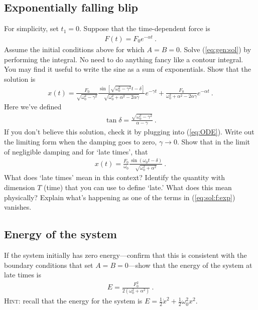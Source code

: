 \documentclass[12pt]{article}
\numberwithin{equation}{section}    %
\begin{document}
\subsection{Exponentially falling blip}

For simplicity, set $t_1 = 0$. Suppose that the time-dependent force is
\begin{align}
	F(t) = F_0 e^{-\alpha t} \ .
\end{align}
Assume the initial conditions above for which $A=B=0$. Solve (\ref{eq:gen:sol}) by performing the integral. No need to do anything fancy like a contour integral. You may find it useful to write the sine as a sum of exponentials. Show that the solution is
\begin{align}
	x(t) = \frac{F_0}{\sqrt{\omega_0^2 - \gamma^2}}
	\frac{\sin\left[ \sqrt{\omega_0^2 - \gamma^2} t - \delta \right]}{\sqrt{\omega_0^2 +\alpha^2 - 2\alpha \gamma}}
	e^{-\gamma t}
	+
	\frac{F_0}{\omega_0^2 + \alpha^2 - 2\alpha\gamma} e^{-\alpha t} \ .
	\label{eq:sol:f:exp}
\end{align}
Here we've defined
\begin{align}
	\tan \delta = \frac{\sqrt{\omega_0^2 - \gamma^2}}{\alpha - \gamma} \ .
\end{align}
If you don't believe this solution, check it by plugging into (\ref{eq:ODE}). Write out the limiting form when the damping goes to zero, $\gamma \to 0$. Show that in the limit of negligible damping and for `late times', that
\begin{align}
	x(t) = \frac{F_0}{\omega_0}\frac{\sin (\omega_0 t -\delta)}{\sqrt{\omega_0^2 + \alpha^2}} \ .
\end{align}
What does `late times' mean in this context? Identify the quantity with dimension $T$ (time) that you can use to define `late.' What does this mean physically? Explain what's happening as one of the terms in (\ref{eq:sol:f:exp}) vanishes.

\subsection{Energy of the system}

If the system initially has zero energy---confirm that this is consistent with the boundary conditions that set $A=B=0$---show that the energy of the system at late times is
\begin{align}
	E = \frac{F_0^2}{2(\omega_0^2 + \alpha^2)}\ .
\end{align}
\textsc{Hint}: recall that the energy for the system is $E = \frac 12 \dot x^2 + \frac 12 \omega_0^2 x^2$.
\end{document}

